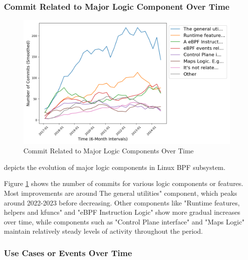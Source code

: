 \subsubsection{Commit Related to Major Logic Component Over Time}
\begin{figure}[ht]
    \centering
    \includegraphics[width=\linewidth]{feature-analysis/timeline_major_related_logic_component_smoothed.png}
    \caption{Commit Related to Major Logic Components Over Time}\label{fig:timeline_major_related_logic_component_smoothed}
\end{figure}
 depicts the evolution of major logic components in Linux BPF subsystem. 

Figure \ref{fig:timeline_major_related_logic_component_smoothed} shows the number of commits for various logic components or features. Most improvements are around The general utilities" component, which peaks around 2022-2023 before decreasing. Other components like "Runtime features, helpers and kfuncs" and "eBPF Instruction Logic" show more gradual increases over time, while components such as "Control Plane interface" and "Maps Logic" maintain relatively steady levels of activity throughout the period.

\subsubsection{Use Cases or Events Over Time}

